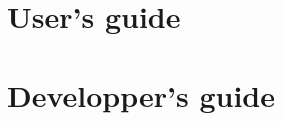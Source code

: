 \documentclass{InsightSoftwareGuide}
\newif\ifitkFullVersion
\newif\ifitkPrintedVersion
\begin{document}
\ifitkFullVersion


% 
\fi


\part{User's guide}

\ifitkFullVersion






\fi




\part{Developper's guide}

\backmatter

%
%





%
%



\ifitkPrintedVersion
\cleardoublepage
\fi
\end{document}
